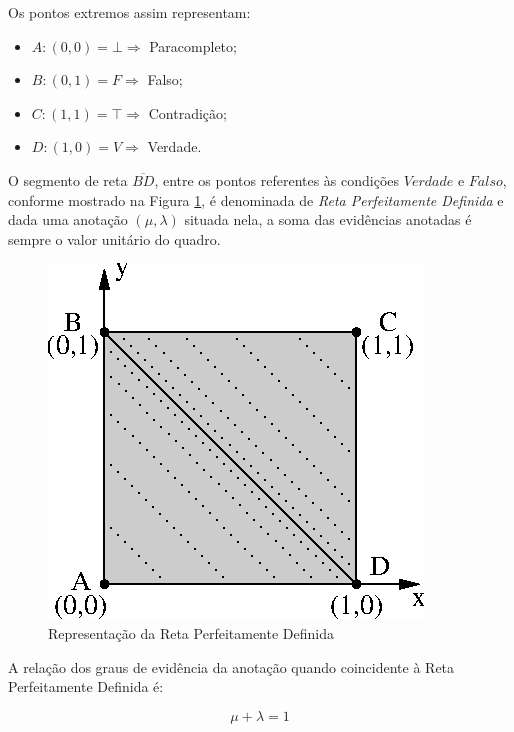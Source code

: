Os pontos extremos assim representam:

\begin{itemize}
\item $A: (0,0) = \bot \Rightarrow $ Paracompleto;
\item $B: (0,1) = F \Rightarrow $ Falso;
\item $C: (1,1) = \top \Rightarrow $ Contradição;
\item $D: (1,0) = V \Rightarrow $ Verdade.
\end{itemize}

O segmento de reta $\overline{BD}$, entre os pontos referentes às condições $Verdade$ e $Falso$, conforme mostrado na Figura \ref{fig:retaPerfeitamenteDefinida}, é denominada de \emph{Reta Perfeitamente Definida} e dada uma anotação $(\mu, \lambda )$ situada nela, a soma das evidências anotadas é sempre o valor unitário do quadro. 

\begin{figure}[!htb]
\center\includegraphics[scale=1.25]{./pic/C424retaPerfeitamenteDefinida.eps}
\caption{Representação da Reta Perfeitamente Definida}
\label{fig:retaPerfeitamenteDefinida}
\end{figure}

A relação dos graus de evidência da anotação quando coincidente à Reta Perfeitamente Definida é: 

\begin{center}
\begin{equation}
\mu + \lambda = 1
\label{eq:evidenciaUnitaria1}
\end{equation}
\end{center}

